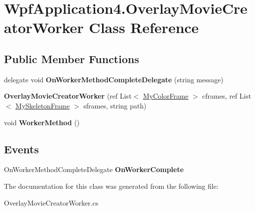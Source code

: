 \hypertarget{class_wpf_application4_1_1_overlay_movie_creator_worker}{\section{Wpf\-Application4.\-Overlay\-Movie\-Creator\-Worker Class Reference}
\label{class_wpf_application4_1_1_overlay_movie_creator_worker}
}
\subsection*{Public Member Functions}
\begin{DoxyCompactItemize}
\item 
\hypertarget{class_wpf_application4_1_1_overlay_movie_creator_worker_a682f986cf2a9e3a133af79cdac908fa4}{delegate void {\bfseries On\-Worker\-Method\-Complete\-Delegate} (string message)}\label{class_wpf_application4_1_1_overlay_movie_creator_worker_a682f986cf2a9e3a133af79cdac908fa4}

\item 
\hypertarget{class_wpf_application4_1_1_overlay_movie_creator_worker_a843256185fd9107be9730e88cb2fd5cc}{{\bfseries Overlay\-Movie\-Creator\-Worker} (ref List$<$ \hyperlink{class_wpf_application4_1_1_my_color_frame}{My\-Color\-Frame} $>$ cframes, ref List$<$ \hyperlink{class_wpf_application4_1_1_my_skeleton_frame}{My\-Skeleton\-Frame} $>$ sframes, string path)}\label{class_wpf_application4_1_1_overlay_movie_creator_worker_a843256185fd9107be9730e88cb2fd5cc}

\item 
\hypertarget{class_wpf_application4_1_1_overlay_movie_creator_worker_aac7ce8d4bbeee004b7668803c01fc6d5}{void {\bfseries Worker\-Method} ()}\label{class_wpf_application4_1_1_overlay_movie_creator_worker_aac7ce8d4bbeee004b7668803c01fc6d5}

\end{DoxyCompactItemize}
\subsection*{Events}
\begin{DoxyCompactItemize}
\item 
\hypertarget{class_wpf_application4_1_1_overlay_movie_creator_worker_a531da1c1e28798ab0121d4832bba7da8}{On\-Worker\-Method\-Complete\-Delegate {\bfseries On\-Worker\-Complete}}\label{class_wpf_application4_1_1_overlay_movie_creator_worker_a531da1c1e28798ab0121d4832bba7da8}

\end{DoxyCompactItemize}


The documentation for this class was generated from the following file\-:\begin{DoxyCompactItemize}
\item 
Overlay\-Movie\-Creator\-Worker.\-cs\end{DoxyCompactItemize}
